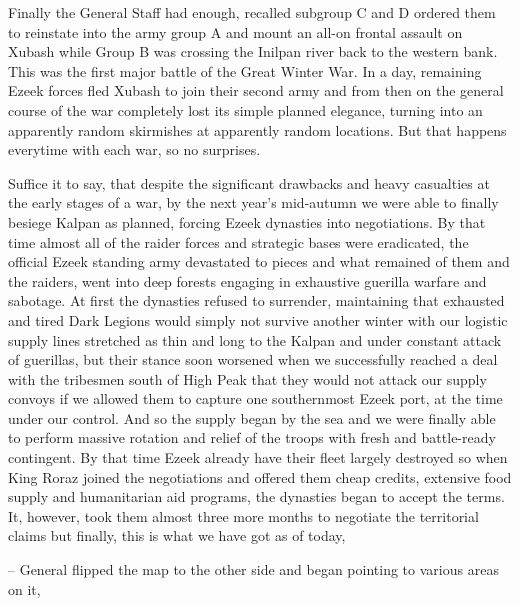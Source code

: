 {Finally the General Staff had enough, recalled subgroup C and D ordered them to reinstate into the army group A and mount an all-on frontal assault on Xubash while Group B was crossing the Inilpan river back to the western bank. This was the first major battle of the Great Winter War. In a day, remaining Ezeek forces fled Xubash to join their second army and from then on the general course of the war completely lost its simple planned elegance, turning into an apparently random skirmishes at apparently random locations. But that happens everytime with each war, so no surprises.

Suffice it to say, that despite the significant drawbacks and heavy casualties at the early stages of a war, by the next year's mid-autumn we were able to finally besiege Kalpan as planned, forcing Ezeek dynasties into negotiations. By that time almost all of the raider forces and strategic bases were eradicated, the official Ezeek standing army devastated to pieces and what remained of them and the raiders, went into deep forests engaging in exhaustive guerilla warfare and sabotage. At first the dynasties refused to surrender, maintaining that exhausted and tired Dark Legions would simply not survive another winter with our logistic supply lines stretched as thin and long to the Kalpan and under constant attack of guerillas, but their stance soon worsened when we successfully reached a deal with the tribesmen south of High Peak that they would not attack our supply convoys if we allowed them to capture one southernmost Ezeek port, at the time under our control. And so the supply began by the sea and we were finally able to perform massive rotation and relief of the troops with fresh and battle-ready contingent. By that time Ezeek already have their fleet largely destroyed so when King Roraz joined the negotiations and offered them cheap credits, extensive food supply and humanitarian aid programs, the dynasties began to accept the terms. It, however, took them almost three more months to negotiate the territorial claims but finally, this is what we have got as of today,} -- General flipped the map to the other side and began pointing to various areas on it, 
